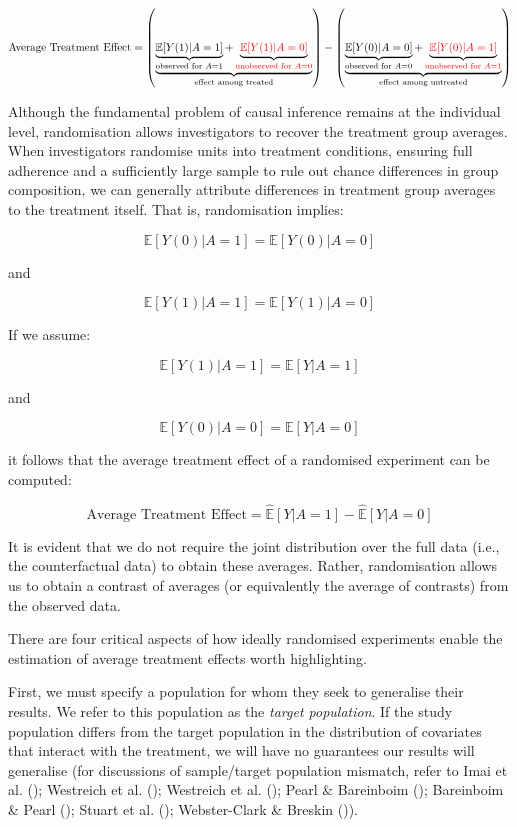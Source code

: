 \documentclass[
  single column]{article}
\begin{document}
\[
\text{Average Treatment Effect} = \left(\underbrace{\underbrace{\mathbb{E}[Y(1)|A = 1]}_{\text{observed for } A = 1} + \underbrace{\textcolor{red}{\mathbb{E}[Y(1)|A = 0]}}_{\textcolor{red}{\text{unobserved for } A = 0}}}_{\text{effect among treated}}\right) - \left(\underbrace{\underbrace{\mathbb{E}[Y(0)|A = 0]}_{\text{observed for } A = 0} + \underbrace{\textcolor{red}{\mathbb{E}[Y(0)|A = 1]}}_{\textcolor{red}{\text{unobserved for } A = 1}}}_{\text{effect among untreated}}\right)
\]

Although the fundamental problem of causal inference remains at the
individual level, randomisation allows investigators to recover the
treatment group averages. When investigators randomise units into
treatment conditions, ensuring full adherence and a sufficiently large
sample to rule out chance differences in group composition, we can
generally attribute differences in treatment group averages to the
treatment itself. That is, randomisation implies:

\[
\mathbb{E}[Y(0) | A = 1] = \mathbb{E}[Y(0) | A = 0]
\]

and

\[
\mathbb{E}[Y(1) | A = 1] = \mathbb{E}[Y(1) | A = 0]
\]

If we assume:

\[ 
\mathbb{E}[Y(1) | A = 1] = \mathbb{E}[Y | A = 1]
\]

and

\[
\mathbb{E}[Y(0) | A = 0] = \mathbb{E}[Y | A = 0]
\]

it follows that the average treatment effect of a randomised experiment
can be computed:

\[
\text{Average Treatment Effect} = \widehat{\mathbb{E}}[Y | A = 1] - \widehat{\mathbb{E}}[Y | A = 0]
\]

It is evident that we do not require the joint distribution over the
full data (i.e., the counterfactual data) to obtain these averages.
Rather, randomisation allows us to obtain a contrast of averages (or
equivalently the average of contrasts) from the observed data.

There are four critical aspects of how ideally randomised experiments
enable the estimation of average treatment effects worth highlighting.

First, we must specify a population for whom they seek to generalise
their results. We refer to this population as the \emph{target
population}. If the study population differs from the target population
in the distribution of covariates that interact with the treatment, we
will have no guarantees our results will generalise (for discussions of
sample/target population mismatch, refer to Imai et al.
(); Westreich et al.
(); Westreich et al.
(); Pearl \& Bareinboim
(); Bareinboim \& Pearl
(); Stuart et al.
(); Webster-Clark \&
Breskin ()).
\end{document}
